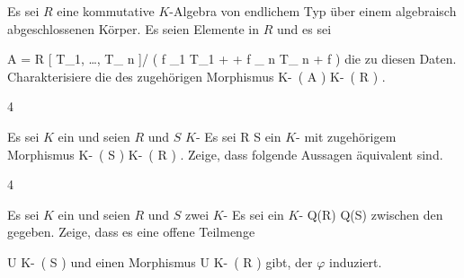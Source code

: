 {}
{





Es sei $R$ eine kommutative $K$-Algebra von endlichem Typ über einem algebraisch abgeschlossenen Körper. Es seien
 Elemente in $R$ und es sei

\mavergleichskettedisp
{\vergleichskette
{A
}
{ =} { R [ T_1, \ldots ,  T_{ n }]/ \left(   f _1  T_{1}   + \cdots +   f _{ n } T_{ n }+ f   \right)
}
{ } {
}
{ } {
}
{ } {
}
}
{}{}{}
die
zu diesen Daten. Charakterisiere die
des zugehörigen Morphismus
\maabbdisp {} { K\!-\!\, \left(  A  \right) } { K\!-\!\, \left(  R  \right)
} {.}





}
{} {}






{4}
{





Es sei $K$ ein
und seien $R$ und $S$
$K$-
Es sei
\maabb {\varphi} { R } { S
} {}
ein
$K$-
mit zugehörigem Morphismus
\maabb {\varphi^*} { K\!-\!\, \left(  S  \right) } { K\!-\!\, \left(  R  \right)
} {.}
Zeige, dass folgende Aussagen äquivalent sind.





}
{} {}

{4}
{





Es sei $K$ ein
und seien $R$ und $S$ zwei
$K$-
Es sei ein
$K$-
\maabbdisp {\varphi} {Q(R) } { Q(S)
} {}
zwischen den
gegeben. Zeige, dass es eine offene Teilmenge

\mavergleichskette
{\vergleichskette
{ U
}
{ \subseteq }{ K\!-\!\, \left(  S  \right)
}
{  }{
}
{    }{
}
{   }{
}
}
{}{}{}
und einen Morphismus
\maabbdisp {} { U } { K\!-\!\, \left(  R  \right)
} {}
gibt, der $\varphi$ induziert.





}
{} {}

